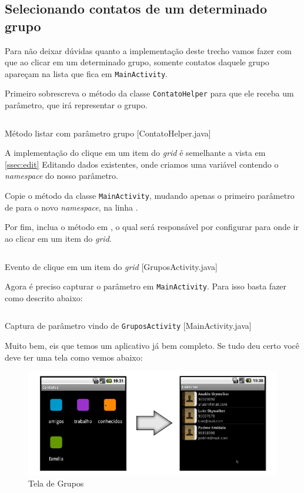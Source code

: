 \subsection{Selecionando contatos de um determinado grupo}

Para não deixar dúvidas quanto a implementação deste trecho vamos fazer com que ao clicar
em um determinado grupo, somente contatos daquele grupo apareçam na lista que fica
em \texttt{MainActivity}.

Primeiro sobrescreva o método  da classe \texttt{ContatoHelper} para que
ele receba um parâmetro, que irá representar o grupo.

\begin{listing}[H]
  \inputminted[linenos=true,frame=bottomline,tabsize=3]{ java }{ source/ContatoHelper-8.java }
  \caption{Método listar com parâmetro grupo [ContatoHelper.java]}
\end{listing}

A implementação do clique em um item do \textit{grid} é semelhante a vista em \ref{ssec:edit}
Editando dados existentes, onde criamos uma variável contendo o \textit{namespace} do nosso parâmetro.

Copie o método  da classe \texttt{MainActivity}, mudando apenas o primeiro
parâmetro de  para o novo \textit{namespace}, na linha .

Por fim, inclua o método  em , o qual será responsável
por configurar para onde ir ao clicar em um item do \textit{grid}.

\begin{listing}[H]
  \inputminted[linenos=true,frame=bottomline,tabsize=3]{ java }{ source/GruposActivity-4.java }
  \caption{Evento de clique em um item do \textit{grid} [GruposActivity.java]}
\end{listing}

Agora é preciso capturar o parâmetro em \texttt{MainActivity}. Para isso basta fazer como descrito abaixo:

\begin{listing}[H]
  \inputminted[linenos=true,frame=bottomline,tabsize=3]{ java }{ source/MainActivity-14.java }
  \caption{Captura de parâmetro vindo de \texttt{GruposActivity} [MainActivity.java]}
\end{listing}

Muito bem, eis que temos um aplicativo já bem completo. Se tudo deu certo você deve ter uma tela como
vemos abaixo:

\begin{figure}[h]
\centering
\includegraphics{img/screenshot-grupos.png}
\caption{Tela de Grupos}
\end{figure}